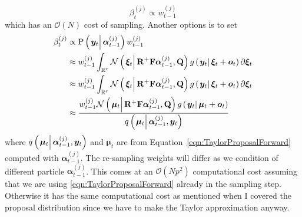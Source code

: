 \documentclass[notitlepage]{article}
\renewcommand{\vec}[1]{\bm{#1}}
\newcommand{\mat}[1]{\mathbf{#1}}
\newcommand{\Lparen}[1]{\left( #1\right)}
\newcommand{\Cond}[2]{\left. #1 \vphantom{#2} \right\vert  #2}
\newcommand{\Prob}{\text{P}}
\newcommand{\optor}[2]{#1\Lparen{#2}}
\newcommand{\optorC}[3]{\optor{#1}{\Cond{#2}{#3}}}
\newcommand{\propC}[2]{\optorC{\Prob}{#1}{#2}}
\newcommand{\normalC}[3]{\optorC{\mathcal{N}}{#1}{#2,#3}}
\newcommand{\IDC}[2]{\optorC{q}{#1}{#2}}
\newcommand{\partic}[3]{#1_{#2}^{\Lparen{#3}}}
\newcommand{\bigO}[1]{\mathcal{O}\Lparen{#1}}
\newcommand{\dimState}{p}
\newcommand{\dimRng}{r}
\newcommand{\nPart}{N}
\begin{document}
\begin{equation}
	\partic{\beta}{t}{j} \propto \partic{w}{t-1}{j}
\end{equation}
%
which has an $\bigO{\nPart}$ cost of sampling. Another options is to set%
%
\begin{equation}\label{eqn:FWWeights}
\begin{split}
	\partic{\beta}{t}{j} &\propto  \propC{\vec{y}_t}{\partic{\vec{\alpha}}{t-1}{j}}\partic{w}{t-1}{j} \\
%
	& \approx \partic{w}{t-1}{j} \int_{\mathbb{R}^\dimRng}
		\normalC{\vec{\xi}_t}{\mat{R}^{+}\mat{F}\partic{\vec{\alpha}}{t-1}{j}}{\mat{Q}}
		\optorC{g}{\vec{y}_t}{\vec{\xi}_t + \vec{o}_t}
		\partial \vec{\xi}_t \\
%
	& \approx \partic{w}{t-1}{j} \int_{\mathbb{R}^\dimRng}
		\normalC{\vec{\xi}_t}{\mat{R}^{+}\mat{F}\partic{\vec{\alpha}}{t-1}{j}}{\mat{Q}}
		\optorC{g}{\vec{y}_t}{\vec{\xi}_t + \vec{o}_t}
		\partial \vec{\xi}_t \\
%
	& \approx \frac{
		\partic{w}{t-1}{j}
		\normalC{\vec{\mu}_t}{\mat{R}^{+}\mat{F}\partic{\vec{\alpha}}{t-1}{j}}{\mat{Q}}
		\optorC{g}{\vec{y}_t}{\vec{\mu}_t + \vec{o}_t}
	}{ %
		\IDC{\vec{\mu}_t}{\partic{\vec{\alpha}}{t-1}{j}, \vec{y}_t}
	}
\end{split}
\end{equation}%
%
where $\IDC{\vec{\mu}_t}{\partic{\vec{\alpha}}{t-1}{j}, \vec{y}_t}$ and $\vec{\mu}_t$ are from Equation~\eqref{eqn:TaylorProposalForward} computed with $\partic{\vec{\alpha}}{t-1}{j}$. The re-sampling weights will differ as we condition of different particle $\partic{\vec{\alpha}}{t-1}{j}$. This comes at an $\bigO{\nPart\dimState^2}$ computational cost assuming that we are using \eqref{eqn:TaylorProposalForward} already in the sampling step. Otherwise it has the same computational cost as mentioned when I covered the proposal distribution since we have to make the Taylor approximation anyway.
\end{document}
